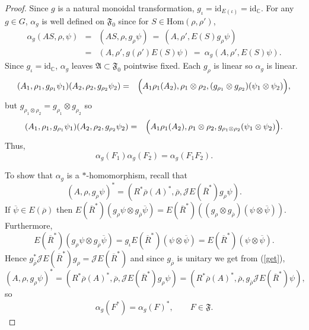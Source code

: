 \documentclass[12pt]{article}
\newcommand{\alg}[1]{\mathfrak{#1}}
\theoremstyle{definition}
\theoremstyle{definition}
\theoremstyle{remark}
\def\2#1{{\mathcal #1}}
\def\7#1{{\mathbb #1}}
\def\ol#1{{\overline #1}}
\newcommand{\Hom}{\mathrm{Hom}}
\def\id{\mathrm{id}}
\begin{document}
\begin{proof} Since $g$ is a natural monoidal transformation, $g _\iota =\id
  _{E(\iota )}=\id _{\7C }$.  For any $g\in G$, $\alpha _g$ is well defined on
  $\alg{F}_0$ since for $S\in \Hom (\rho ,\rho ')$,
  \begin{eqnarray*} \alpha _g(AS,\rho ,\psi )&=& (AS,\rho ,g_\rho \psi ) \:=\:
    (A,\rho ', E(S)g_\rho \psi ) \\
    &=& (A,\rho ', g(\rho ')E(S)\psi ) \: =\: \alpha _g(A,\rho ',E(S)\psi ).
  \end{eqnarray*} Since $g _\iota =\id _{\7C}$, $\alpha _g$ leaves $\alg{A}\subset
  \alg{F}_0$ pointwise fixed.  Each $g_\rho $ is linear so $\alpha _g$ is linear.
  \begin{eqnarray*} (A_1,\rho _1,g _{\rho _1}\psi _1)(A_2,\rho _2,g_{\rho _2}\psi _2)
    &=& \Bigl( A_1\rho _1(A_2),\rho _1\otimes \rho _2,(g _{\rho _1}\otimes g_{\rho
      _2})(\psi _1\otimes \psi _2) \Bigr) ,\end{eqnarray*} but $g_{\rho _1\otimes
    \rho _2}=g_{\rho _1}\otimes g_{\rho _2}$ so
  \begin{eqnarray*} (A_1,\rho _1,g_{\rho _1}\psi _1)(A_2,\rho _2,g_{\rho _2}\psi _2)
    &=& \Bigl( A_1\rho _1(A_2),\rho _1\otimes \rho _2,g_{\rho _1\otimes \rho _2}(\psi
    _1\otimes \psi _2) \Bigr) .\end{eqnarray*} Thus,
  \begin{equation} \label{homo} \alpha _g(F_1)\alpha _g(F_2)=\alpha _g(F_1F_2)
    .\end{equation}

To show that $\alpha _g$ is a $*$-homomorphism, recall that
\begin{equation} (A,\rho ,g_\rho \psi )^*=(R^*\ol\rho (A)^*,\ol\rho ,\2JE(\ol
  R^*)g_\rho \psi ).\label{get} \end{equation} If $\ol\psi \in E(\ol\rho )$ then
$E(\ol R^*)(g_\rho \psi \otimes g_{\ol\rho }\ol\psi )=E(\ol R^*)((g_\rho \otimes
g_{\ol\rho})(\psi \otimes \ol\psi ))$.  Furthermore,
$$ E(\ol R^*)(g_\rho \psi \otimes g _{\ol\rho }\ol\psi )=g _\iota E(\ol R^*)(\psi
\otimes \ol\psi )=E(\ol R^*)(\psi \otimes \ol\psi ).$$ Hence $g _{\ol \rho
}^*\2JE(\ol R^*)g_\rho =\2JE(\ol R^*)$ and since $g _{\ol\rho }$ is unitary we get
from (\ref{get}),
$$ (A,\rho ,g_\rho \psi )^*=(R^*\ol\rho (A)^*,\ol\rho ,\2JE(\ol R^*)g_\rho \psi )=(R^*\ol\rho
(A)^*,\ol\rho ,g _{\ol\rho }\2JE(\ol R^*)\psi ) ,$$ so \begin{equation} \alpha
  _g(F^*)=\alpha _g(F)^* ,\qquad F\in \alg{F}. \label{star} \end{equation}


\end{proof}
\end{document}
